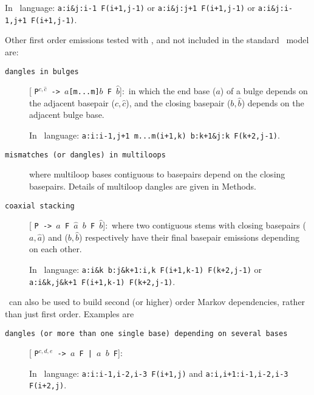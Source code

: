 \begin{description}
\begin{footnotesize}
\begin{description}
In \tornado\, language: \texttt{a:i\&j:i-1 F(i+1,j-1)} or \texttt{a:i\&j:j+1  F(i+1,j-1)} or
\texttt{a:i\&j:i-1,j+1  F(i+1,j-1)}.

\end{description}
\end{footnotesize}
  
\noindent
Other first order emissions tested with \tornado, and not included in
the standard \nn\, model are:

\begin{footnotesize}
\begin{description}
\item[\texttt{dangles in bulges}] [ \texttt{P$^{c,\hat c}$ ->
    $a$[m...m]$b$ F $\hat b$}]:\, in which the end base ($a$) of a
  bulge depends on the adjacent basepair (${c,\hat c}$), and the
  closing basepair (${b,\hat b}$) depends on the adjacent bulge base.

 In \tornado\, language: \texttt{a:i:i-1,j+1 m...m(i+1,k) b:k+1\&j:k  F(k+2,j-1)}.

\item[\texttt{mismatches (or dangles) in multiloops}] where multiloop
bases contiguous to basepairs depend on the closing basepairs. Details
of multiloop dangles are given in Methods.

\item[\texttt{coaxial stacking}][ \texttt{P -> $a$ F $\hat a$ $b$ F
    $\hat b$}]:\, where two contiguous stems with closing basepairs
  (${a,\hat a}$) and (${b,\hat b}$) respectively have their final
  basepair emissions depending on each other.

 In \tornado\, language: \texttt{a:i\&k b:j\&k+1:i,k F(i+1,k-1)
   F(k+2,j-1)} or \texttt{a:i\&k,j\&k+1 F(i+1,k-1) F(k+2,j-1)}.

\end{description} 
\end{footnotesize}

\noindent
\tornado\, can also be used to build second (or higher) order Markov
dependencies, rather than just first order. Examples are

\begin{footnotesize}
\begin{description}
\item[\texttt{dangles (or more than one single base) depending on several bases}] [
  \texttt{P$^{c,d,e}$ -> $a$ F | $a$ $b$ F}]:\, 

In \tornado\, language: \texttt{a:i:i-1,i-2,i-3 F(i+1,j)} and
\texttt{a:i,i+1:i-1,i-2,i-3 F(i+2,j)}.


\end{description}
\end{footnotesize}
\end{description}
